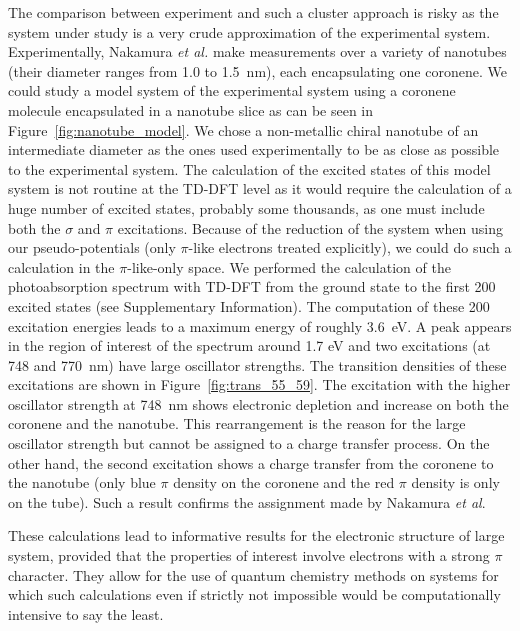 \documentclass[12pt]{article}
\begin{document}
 The comparison between experiment and such a cluster approach is risky as the system under study	
is a very crude approximation of the experimental system.	
Experimentally, Nakamura \emph{et al.} make measurements over a variety of nanotubes (their	
diameter ranges from 1.0 to 1.5~nm), each encapsulating one coronene.	
We could study a model system of the experimental system	
using a coronene molecule encapsulated in a nanotube slice as can be seen in Figure~\ref{fig:nanotube_model}.	
We chose a non-metallic chiral nanotube of an intermediate diameter as the ones used experimentally to	
be as close as possible to the experimental system.	
The calculation of the excited states of this model system is not routine	
at the TD-DFT level as it would require the calculation of a huge number of excited states, probably	
some thousands, as one must include both the $\sigma$ and $\pi$ excitations.	
Because of the reduction of the system when using our pseudo-potentials	
(only $\pi$-like electrons treated explicitly), we could do such a calculation in the $\pi$-like-only space.	
We performed the calculation of the photoabsorption spectrum with TD-DFT from the	
ground state to the first 200 excited states (see Supplementary Information).	
The computation of these 200 excitation energies leads to a maximum energy of roughly 3.6~eV.	
A peak appears in the region of interest of the spectrum around 1.7 eV and two excitations (at 748 and 770~nm) 	
have large oscillator strengths.	
The transition densities of these excitations are shown in Figure~\ref{fig:trans_55_59}.	
The excitation with the higher oscillator strength at 748~nm shows electronic depletion and	
increase on both the coronene and the nanotube.	
This rearrangement is the reason for the large oscillator strength but cannot be assigned	
to a charge transfer process.	
On the other hand, the second excitation shows a charge transfer from the coronene	
to the nanotube (only blue $\pi$ density on the coronene and the red $\pi$ density	
is only on the tube).	
Such a result confirms the assignment made by Nakamura \emph{et al}.	

 These calculations lead to informative results for the	
electronic structure of large system, provided that the properties of interest involve	
electrons with a strong $\pi$ character.	
They allow for the use of quantum chemistry methods on systems for which such calculations	
even if strictly not impossible would be computationally intensive to say the least.
\end{document}
